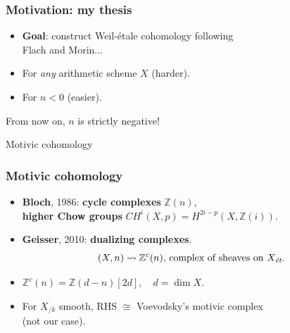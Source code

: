 \documentclass[handout]{beamer}
\newcommand{\ZZ}{\mathbb{Z}}
\newcommand{\isom}{\cong}
\newcommand{\term}{\textbf}
\begin{document}

\begin{frame}
  \frametitle{Motivation: my thesis}

  \begin{itemize}
  \item<2-> \textbf{Goal}: construct Weil-étale cohomology following\\
    Flach and Morin...

  \item<3-> For \emph{any} arithmetic scheme $X$ (harder).

  \item<4-> For $n < 0$ (easier).
  \end{itemize}

  \begin{center}
    {\large From now on, $n$ is strictly negative!}
  \end{center}

\end{frame}


\begin{frame}[plain]
  \headingfont

  \vspace{\fill}

  \begin{center}
    {\huge Motivic cohomology}
  \end{center}

  \vspace{\fill}
\end{frame}


\begin{frame}
  \frametitle{Motivic cohomology}

  \begin{itemize}
  \item<2-> \term{Bloch}, 1986: \term{cycle complexes} $\ZZ (n)$,\\
    \term{higher Chow groups} $CH^i (X,p) = H^{2i - p} (X, \ZZ (i))$.

  \item<3-> \term{Geisser}, 2010: \term{dualizing complexes}.
    $$(X,n) \rightsquigarrow \ZZ^c (n) \text{, complex of sheaves on }X_\text{\it ét}.$$

  \item<4-> $\ZZ^c (n) = \ZZ (d-n) [2d], \quad d = \dim X$.

  \item<5->[*] For $X_{/k}$ smooth, RHS $\isom$ Voevodsky's motivic complex\\
    (not our case).
  \end{itemize}
\end{frame}
\end{document}

